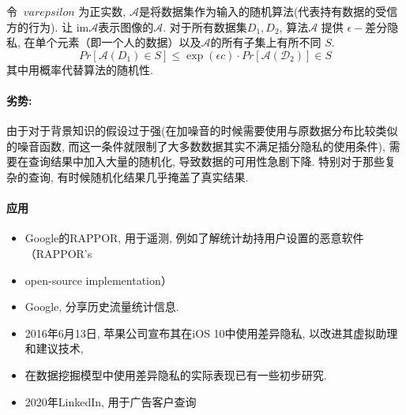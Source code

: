 令 $\ varepsilon$ 为正实数, $\mathcal{A}$是将数据集作为输入的随机算法(代表持有数据的受信方的行为). 让 $\textrm{im}\mathcal{A}$表示图像的$\mathcal {A}$. 对于所有数据集$D_{1}, D_{2}$, 
算法$\mathcal{A}$ 提供 $\epsilon-$差分隐私, 在单个元素（即一个人的数据）以及$\mathcal{A}$的所有子集上有所不同 $S$. 
$$ Pr [ \mathcal{A}(D_1) \in S ] \leqslant \exp(\epsilon c) \cdot Pr [ \mathcal{A(D_2)} ] \in S  $$
其中用概率代替算法的随机性.  
  
\paragraph{劣势:}由于对于背景知识的假设过于强(在加噪音的时候需要使用与原数据分布比较类似的噪音函数, 而这一条件就限制了大多数数据其实不满足插分隐私的使用条件), 需要在查询结果中加入大量的随机化, 导致数据的可用性急剧下降. 特别对于那些复杂的查询, 有时候随机化结果几乎掩盖了真实结果. 
\paragraph{应用}
\begin{itemize}
    \item Google的RAPPOR, 用于遥测, 例如了解统计劫持用户设置的恶意软件（RAPPOR's \item open-source implementation）
    \item Google, 分享历史流量统计信息. 
    \item 2016年6月13日, 苹果公司宣布其在iOS 10中使用差异隐私, 以改进其虚拟助理和建议技术,  
    \item 在数据挖掘模型中使用差异隐私的实际表现已有一些初步研究. \citep{FLETCHER201716}
    \item 2020年LinkedIn, 用于广告客户查询
\end{itemize}
